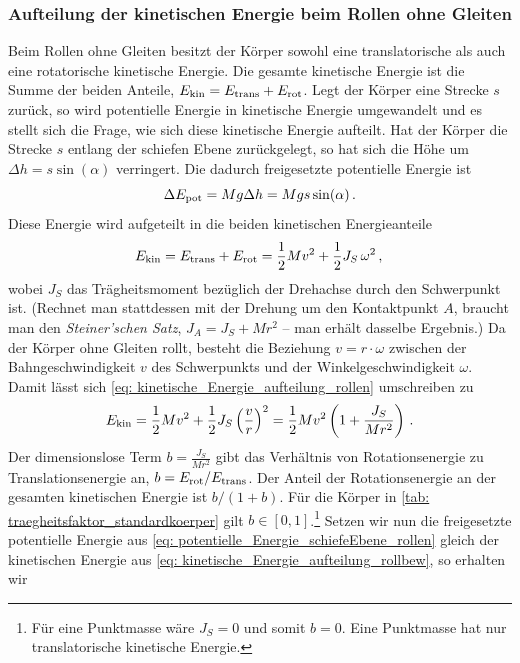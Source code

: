 \subsubsection{Aufteilung der kinetischen Energie beim Rollen ohne Gleiten}
Beim Rollen ohne Gleiten besitzt der Körper sowohl eine translatorische als auch eine rotatorische kinetische Energie. Die gesamte kinetische Energie ist die Summe der beiden Anteile, $E_{\mathrm{kin}} = E_{\mathrm{trans}} + E_{\mathrm{rot}}$. Legt der Körper eine Strecke $s$ zurück, so wird potentielle Energie in kinetische Energie umgewandelt und es stellt sich die Frage, wie sich diese kinetische Energie aufteilt.
Hat der Körper die Strecke $s$ entlang der schiefen Ebene zurückgelegt, so hat sich die Höhe um $\Delta h = s \sin(\alpha)$ verringert. Die dadurch freigesetzte potentielle Energie ist
\begin{equation}\label{eq: potentielle_Energie_schiefeEbene_rollen}
    \Delta E_{\mathrm{pot}} = M g \Delta h = M g s \sin(\alpha) \,.
\end{equation}
Diese Energie wird aufgeteilt in die beiden kinetischen Energieanteile
\begin{equation}\label{eq: kinetische_Energie_aufteilung_rollen}
    E_{\mathrm{kin}} = E_{\mathrm{trans}} + E_{\mathrm{rot}} = \frac{1}{2} M v^2 + \frac{1}{2} J_S \,\omega^2 \,{,}\,
\end{equation}
wobei $J_S$ das Trägheitsmoment bezüglich der Drehachse durch den Schwerpunkt ist. (Rechnet man stattdessen mit der Drehung um den Kontaktpunkt $A$, braucht man den \textit{Steiner'schen Satz}, $J_A = J_S + M r^2$ -- man erhält dasselbe Ergebnis.) Da der Körper ohne Gleiten rollt, besteht die Beziehung $v = r \cdot \omega$ zwischen der Bahngeschwindigkeit $v$ des Schwerpunkts und der Winkelgeschwindigkeit $\omega$. Damit lässt sich \cref{eq: kinetische_Energie_aufteilung_rollen} umschreiben zu
\begin{equation}\label{eq: kinetische_Energie_aufteilung_rollbew}
    E_{\mathrm{kin}} = \frac{1}{2} M v^2 + \frac{1}{2} J_S \left(\frac{v}{r}\right)^2 = \frac{1}{2} M v^2 \left( 1 + \frac{J_S}{M r^2} \right) \,.
\end{equation}
Der dimensionslose Term $b = \frac{J_S}{M r^2}$ gibt das Verhältnis von Rotationsenergie zu Translationsenergie an, $b = E_{\mathrm{rot}}/E_{\mathrm{trans}}$. Der Anteil der Rotationsenergie an der gesamten kinetischen Energie ist $b/(1+b)$. Für die Körper in \cref{tab: traegheitsfaktor_standardkoerper} gilt $b \in [0,1]$.\footnote{Für eine Punktmasse wäre $J_S = 0$ und somit $b=0$. Eine Punktmasse hat nur translatorische kinetische Energie.} Setzen wir nun die freigesetzte potentielle Energie aus \cref{eq: potentielle_Energie_schiefeEbene_rollen} gleich der kinetischen Energie aus \cref{eq: kinetische_Energie_aufteilung_rollbew}, so erhalten wir
